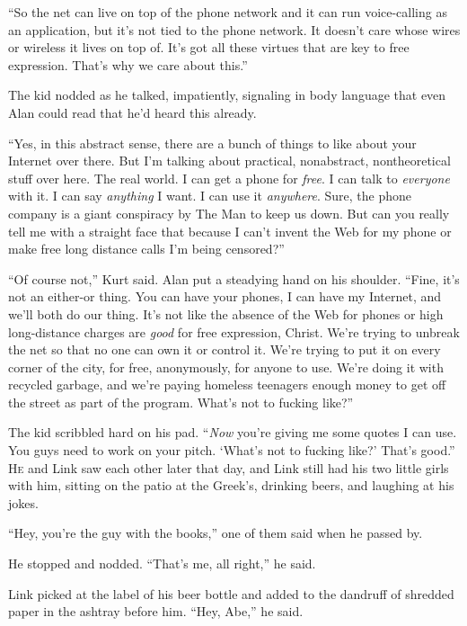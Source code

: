 \documentclass{article}
\begin{document}
``So the net can live on top of the phone network and it can run
voice-calling as an application, but it's not tied to the phone
network.  It doesn't care whose wires or wireless it lives on top of. 
It's got all these virtues that are key to free expression.  That's
why we care about this.''

The kid nodded as he talked, impatiently, signaling in body language
that even Alan could read that he'd heard this already.

``Yes, in this abstract sense, there are a bunch of things to like
about your Internet over there.  But I'm talking about practical,
nonabstract, nontheoretical stuff over here.  The real world.  I can
get a phone for \textit{free}.  I can talk to \textit{everyone} with
it.  I can say \textit{anything} I want.  I can use it
\textit{anywhere}.  Sure, the phone company is a giant conspiracy by
The Man to keep us down.  But can you really tell me with a straight
face that because I can't invent the Web for my phone or make free
long distance calls I'm being censored?''

``Of course not,'' Kurt said.  Alan put a steadying hand on his
shoulder.  ``Fine, it's not an either-or thing.  You can have your
phones, I can have my Internet, and we'll both do our thing.  It's not
like the absence of the Web for phones or high long-distance charges
are \textit{good} for free expression, Christ.  We're trying to
unbreak the net so that no one can own it or control it.  We're trying
to put it on every corner of the city, for free, anonymously, for
anyone to use.  We're doing it with recycled garbage, and we're paying
homeless teenagers enough money to get off the street as part of the
program.  What's not to fucking like?''

The kid scribbled hard on his pad.  ``\textit{Now} you're giving me
some quotes I can use.  You guys need to work on your pitch.  `What's
not to fucking like?' That's good.''
\\
\lettrine[lines=3, lhang=.5, nindent=0pt, findent=2pt]{H}{e} and Link saw each other later that day, and Link still had his two
little girls with him, sitting on the patio at the Greek's, drinking
beers, and laughing at his jokes.

``Hey, you're the guy with the books,'' one of them said when he
passed by. 

He stopped and nodded.  ``That's me, all right,'' he said.

Link picked at the label of his beer bottle and added to the dandruff
of shredded paper in the ashtray before him.  ``Hey, Abe,'' he said.
\end{document}
